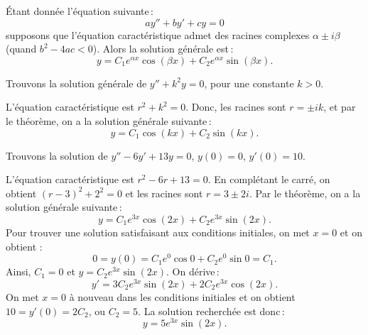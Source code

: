 \begin{theorem}
Étant donnée l'équation suivante\,:
\begin{equation*}
ay'' + by' + cy = 0 
\end{equation*}
supposons que l'équation caractéristique admet des racines complexes $\alpha \pm i \beta$
(quand $b^2 - 4ac < 0$).
Alors la solution générale est\,: 
\begin{equation*}
y = C_1 e^{\alpha x} \cos (\beta x) + C_2 e^{\alpha x} \sin (\beta x) .
\end{equation*}
\end{theorem}

\begin{example} \label{example:sincossecondorder}
Trouvons la solution générale de $y'' + k^2 y = 0$, pour une constante 
$k > 0$.

L'équation caractéristique est  $r^2 + k^2 = 0$.  Donc, les racines sont 
$r = \pm ik$, et par le théorème, on a la solution générale  suivante\,:
\begin{equation*}
y = C_1 \cos (kx) + C_2 \sin (kx) .
\end{equation*}
\end{example}

\begin{example}
Trouvons la solution de  $y'' - 6 y' + 13 y = 0$, $y(0) = 0$, $y'(0) =
10$.

L'équation caractéristique est  $r^2 - 6 r + 13 = 0$. En complétant le carré, on obtient   ${(r-3)}^2 + 2^2 = 0$ et les racines sont
$r = 3 \pm 2i$.
Par le théorème, on a la solution générale suivante\,:
\begin{equation*}
y = C_1 e^{3x} \cos (2x) + C_2 e^{3x} \sin (2x) .
\end{equation*}
Pour trouver une solution satisfaisant aux conditions initiales, on met $x=0$ et on obtient :
\begin{equation*}
0 = y(0) = C_1 e^{0} \cos 0 + C_2 e^{0} \sin 0  = C_1 .
\end{equation*}
Ainsi, $C_1 = 0$ et $y = C_2 e^{3x} \sin (2x)$.  On dérive\,: 
\begin{equation*}
y' = 3C_2 e^{3x} \sin (2x) + 2C_2 e^{3x} \cos (2x) .
\end{equation*}
On met $x=0$ à nouveau dans les conditions initiales et on obtient  $10 = y'(0) = 2C_2$, ou
$C_2 = 5$.  La solution recherchée est donc\,:
\begin{equation*}
y = 5 e^{3x} \sin (2x) .
\end{equation*}
\end{example}

